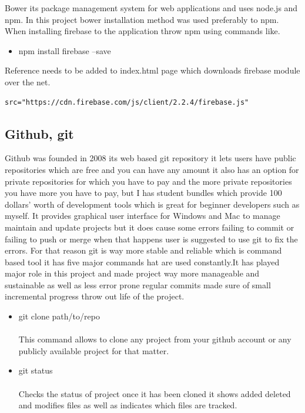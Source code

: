 \begin{itemize}
\bigbreak

Bower its package management system for web applications and uses node.js and npm.
In this project bower installation method was used preferably to npm. When installing firebase to the application throw npm using commands like.

\begin{itemize}
	\item npm install firebase –save
\end{itemize}
Reference needs to be added to index.html page which downloads firebase module over the net.


\begin{verbatim}
src="https://cdn.firebase.com/js/client/2.2.4/firebase.js"
\end{verbatim}




\subsection{Github, git}
\bigbreak
Github was founded in 2008 its web based git repository it lets users have public repositories which are free and you can have any amount it also has an option for private repositories for which you have to pay and the more private repositories you have more you have to pay, but I has student bundles which provide 100 dollars’ worth of development tools which is great for beginner developers such as myself. It provides graphical user interface for Windows and Mac to manage maintain and update projects but it does cause some errors failing to commit or failing to push or merge when that happens user is suggested to use git to fix the errors. For that reason git is way more stable and reliable which is command based tool it has five major commands hat are used constantly.It has played major role in this project and made project way more manageable and sustainable as well as less error prone regular commits made sure of small incremental progress throw out life of the project.

\begin{itemize}
	
\item git clone path/to/repo \\
\\This command allows to clone any project from your github account or any publicly available project for that matter.

\item git status \\
\\Checks the status of project once it has been cloned it shows added deleted and modifies files as well as indicates which files are tracked.


\end{itemize}
\end{itemize}
